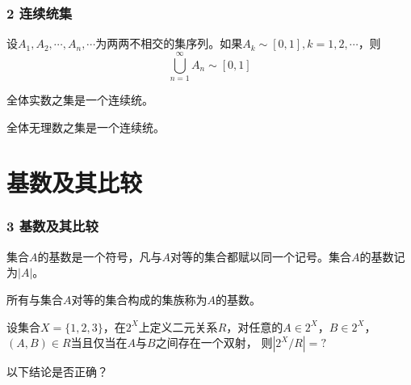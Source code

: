 \documentclass{beamer}
\begin{document}
\begin{CJK*}{UTF8}{gbsn}
\begin{frame}
  \frametitle{2 连续统集}
  \begin{Thm}
    设$A_1, A_2, \cdots, A_n, \cdots$为两两不相交的集序列。如果$A_k \sim [0,1], k = 1, 2, \cdots$，则
    \[\bigcup_{n=1}^{\infty}A_n \sim [0,1]\]
  \end{Thm}\pause
  \begin{Cor}
    全体实数之集是一个连续统。
  \end{Cor}\pause
  \begin{Cor}
    全体无理数之集是一个连续统。
  \end{Cor}
\end{frame}


\section{基数及其比较}
\begin{frame}
  \frametitle{3 基数及其比较}
  \begin{Def}
    集合$A$的基数是一个符号，凡与$A$对等的集合都赋以同一个记号。集合$A$的基数记为$|A|$。
  \end{Def}\pause
  \begin{Def}
    所有与集合$A$对等的集合构成的集族称为$A$的基数。
  \end{Def}
\end{frame}
\begin{frame}[t] \justifying\let\raggedright\justifying
  设集合$X=\{1,2,3\}$，在$2^X$上定义二元关系$R$，对任意的$A\in 2^X$，$B\in 2^X$，$(A,B)\in R$当且仅当在$A$与$B$之间存在一个双射，
  则$|2^X/R|=?$
\end{frame}
\begin{frame}[t] \justifying\let\raggedright\justifying
 以下结论是否正确？


\end{frame}
\end{CJK*}
\end{document}
